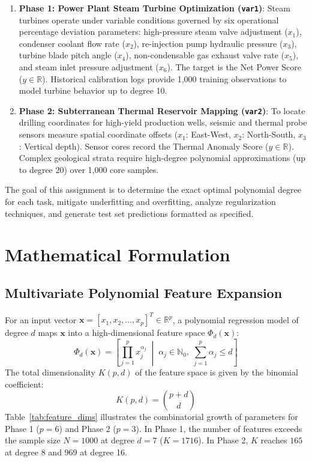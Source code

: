 \documentclass[10pt,twocolumn,a4paper]{article}
\begin{document}
\begin{enumerate}
    \item \textbf{Phase 1: Power Plant Steam Turbine Optimization (\texttt{var1})}: Steam turbines operate under variable conditions governed by six operational percentage deviation parameters: high-pressure steam valve adjustment ($x_1$), condenser coolant flow rate ($x_2$), re-injection pump hydraulic pressure ($x_3$), turbine blade pitch angle ($x_4$), non-condensable gas exhaust valve rate ($x_5$), and steam inlet pressure adjustment ($x_6$). The target is the Net Power Score ($y \in \mathbb{R}$). Historical calibration logs provide 1,000 training observations to model turbine behavior up to degree 10.
    \item \textbf{Phase 2: Subterranean Thermal Reservoir Mapping (\texttt{var2})}: To locate drilling coordinates for high-yield production wells, seismic and thermal probe sensors measure spatial coordinate offsets ($x_1$: East-West, $x_2$: North-South, $x_3$: Vertical depth). Sensor cores record the Thermal Anomaly Score ($y \in \mathbb{R}$). Complex geological strata require high-degree polynomial approximations (up to degree 20) over 1,000 core samples.
\end{enumerate}

The goal of this assignment is to determine the exact optimal polynomial degree for each task, mitigate underfitting and overfitting, analyze regularization techniques, and generate test set predictions formatted as specified.

\section{Mathematical Formulation}

\subsection{Multivariate Polynomial Feature Expansion}
For an input vector $\mathbf{x} = [x_1, x_2, \dots, x_p]^T \in \mathbb{R}^p$, a polynomial regression model of degree $d$ maps $\mathbf{x}$ into a high-dimensional feature space $\Phi_d(\mathbf{x})$:
\begin{equation}
\Phi_d(\mathbf{x}) = \left[ \prod_{j=1}^p x_j^{\alpha_j} \;\middle|\; \alpha_j \in \mathbb{N}_0, \; \sum_{j=1}^p \alpha_j \le d \right]
\end{equation}
The total dimensionality $K(p, d)$ of the feature space is given by the binomial coefficient:
\begin{equation}
K(p, d) = \binom{p + d}{d}
\end{equation}
Table~\ref{tab:feature_dims} illustrates the combinatorial growth of parameters for Phase 1 ($p=6$) and Phase 2 ($p=3$). In Phase 1, the number of features exceeds the sample size $N=1000$ at degree $d=7$ ($K=1716$). In Phase 2, $K$ reaches $165$ at degree 8 and $969$ at degree 16.
\end{document}
